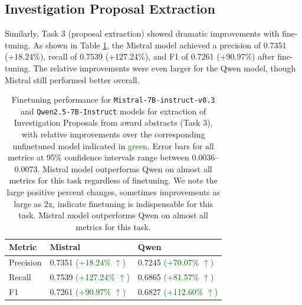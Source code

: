 \documentclass[11pt]{article}
\begin{document}
\subsection{Investigation Proposal Extraction}
Similarly, Task 3 (proposal extraction) showed dramatic improvements with fine-tuning. As shown in Table \ref{tab:eval_technontech2ip}, the Mistral model achieved a precision of 0.7351 (+18.24\%), recall of 0.7539 (+127.24\%), and F1 of 0.7261 (+90.97\%) after fine-tuning. The relative improvements were even larger for the Qwen model, though Mistral still performed better overall.
\begin{table}[h!]
\centering
{\small
\begin{tabular}{lll}
\toprule
Metric & Mistral & Qwen\\
\midrule
Precision
 & 0.7351 \textcolor{darkgreen}{(+18.24\% $\uparrow$)} 
 & 0.7245 \textcolor{darkgreen}{(+70.07\% $\uparrow$)} \\
Recall 
 & 0.7539 \textcolor{darkgreen}{(+127.24\% $\uparrow$)} 
 & 0.6865 \textcolor{darkgreen}{(+81.57\% $\uparrow$)} \\
F1
 & 0.7261 \textcolor{darkgreen}{(+90.97\% $\uparrow$)} 
 & 0.6827 \textcolor{darkgreen}{(+112.60\% $\uparrow$)} \\
\bottomrule
\end{tabular}
\caption{Finetuning performance for \texttt{Mistral-7B-instruct-v0.3}
 and \texttt{Qwen2.5-7B-Instruct}
 models for extraction of Investigation Proposals from award abstracts (Task 3), with relative improvements over the corresponding unfinetuned model indicated in \textcolor{darkgreen}{green}. Error bars for all metrics at 95\% confidence intervals range between 0.0036--0.0073. Mistral model outperforms Qwen on almost all metrics for this task regardless of finetuning. We note the large positive percent changes, sometimes improvements as large as 2x, indicate finetuning is indispensable for this task. Mistral model outperforms Qwen on almost all metrics for this task.}
\label{tab:eval_technontech2ip}
}
\end{table}
\end{document}

